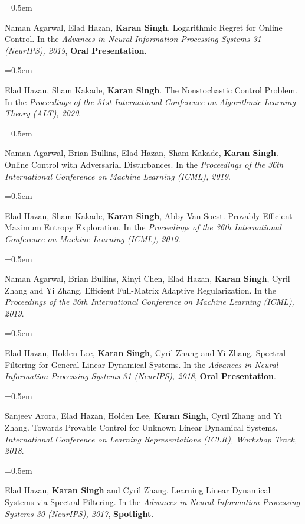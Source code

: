 \documentclass{scrartcl}
\newcommand{\Description}[1]{\hangindent=0.5em\hangafter=0\noindent\raggedright\footnotesize{#1}\par\normalsize\vspace{1em}} %
\begin{document}
\begin{cv}{}




\noindent{} 

\Description{Naman Agarwal, Elad Hazan, \textbf{Karan Singh}. Logarithmic Regret for Online Control. In the \textit{Advances in Neural Information Processing Systems 31 (NeurIPS), 2019}, \textbf{Oral Presentation}.}
\vspace{-0.3em}
\Description{Elad Hazan, Sham Kakade, \textbf{Karan Singh}. The Nonstochastic Control Problem. In the \textit{Proceedings of the 31st International Conference on Algorithmic Learning Theory (ALT), 2020}.}
\vspace{-0.3em}
\Description{Naman Agarwal, Brian Bullins, Elad Hazan, Sham Kakade, \textbf{Karan Singh}. Online Control with Adversarial Disturbances. In the \textit{Proceedings of the 36th International Conference on Machine Learning (ICML), 2019}.}
\vspace{-0.3em}
\Description{Elad Hazan, Sham Kakade, \textbf{Karan Singh}, Abby Van Soest. Provably Efficient Maximum Entropy Exploration. In the \textit{Proceedings of the 36th International Conference on Machine Learning (ICML), 2019}.}
\vspace{-0.3em}
\Description{Naman Agarwal, Brian Bullins, Xinyi Chen, Elad Hazan, \textbf{Karan Singh}, Cyril Zhang and Yi Zhang. Efficient Full-Matrix Adaptive Regularization. In the \textit{Proceedings of the 36th International Conference on Machine Learning (ICML), 2019}.}
\vspace{-0.3em}
\Description{Elad Hazan, Holden Lee, \textbf{Karan Singh}, Cyril Zhang and Yi Zhang. Spectral Filtering for General Linear Dynamical Systems. In the \textit{Advances in Neural Information Processing Systems 31 (NeurIPS), 2018}, \textbf{Oral Presentation}.}
\vspace{-0.3em}
\Description{Sanjeev Arora, Elad Hazan, Holden Lee, \textbf{Karan Singh}, Cyril Zhang and Yi Zhang. Towards Provable Control for Unknown Linear Dynamical Systems. \textit{International Conference on Learning Representations (ICLR), Workshop Track, 2018}.}
\vspace{-0.3em}
\Description{Elad Hazan, \textbf{Karan Singh} and Cyril Zhang. Learning Linear Dynamical Systems via Spectral Filtering. In the \textit{Advances in Neural Information Processing Systems 30 (NeurIPS), 2017}, \textbf{Spotlight}.}

\end{cv}
\end{document}
